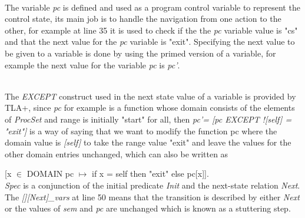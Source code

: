 \documentclass{thesul}
\begin{document}
\hfill\\
The variable \textit{pc} is defined and used as a program control variable to represent the control state, its main job is to handle the navigation from one action to the other, for example at line 35 it is used to check if the the \textit{pc} variable value is "cs" and that the next value for the \textit{pc} variable is "exit". Specifying the next value to be given to a variable is done by using the primed version of a variable, for example the next value for the variable \textit{pc} is \textit{pc'}.

\hfill\\
The \textit{EXCEPT} construct used in the next state value of a variable is provided by TLA+, since \textit{pc} for example is a function whose domain consists of the elements of \textit{ProcSet} and range is initially "start" for all, then \textit{pc'= [pc EXCEPT ![self] = "exit"]} is a way of saying that we want to modify the function pc where the domain value is \textit{[self]} to take the range value "exit" and leave the values for the other domain entries unchanged, which can also be written as

[x $\in$ DOMAIN pc $\longmapsto$ if x = self then "exit" else pc[x]].
\hfill\\

\textit{Spec} is a conjunction of the initial predicate \textit{Init} and the next-state relation \textit{Next}. The \textit{[][Next]\_{vars}} at line 50 means that the transition is described by either \textit{Next} or the values of \textit{sem} and \textit{pc} are unchanged which is known as a stuttering step.
\end{document}
